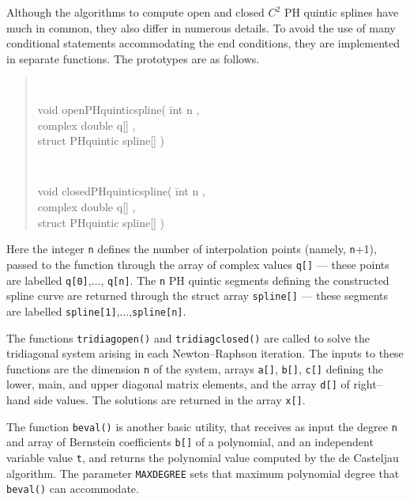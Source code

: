 \documentclass[12pt]{article}
\begin{document}
Although the algorithms to compute open and closed $C^2$ PH quintic splines 
have much in common, they also differ in numerous details. To avoid the use 
of many conditional statements accommodating the end conditions, they are 
implemented in separate functions. The prototypes are as follows. 

\begin{quote}
{\tt
\begin{tabbing}
void open\underline{\hphantom{x}}PHquintic\underline{\hphantom{x}}spline( 
\= int n , \\
\> complex double q[] , \\
\> struct PHquintic spline[] )
\end{tabbing}
}

{\tt
\begin{tabbing}
void closed\underline{\hphantom{x}}PHquintic\underline{\hphantom{x}}spline( 
\= int n , \\
\> complex double q[] , \\
\> struct PHquintic spline[] )
\end{tabbing}
}
\end{quote}

\noindent
Here the integer {\tt n} defines the number of interpolation points 
(namely, {\tt n}+1), passed to the function through the array of complex 
values {\tt q[]} --- these points are labelled {\tt q[0]},$\ldots$,
{\tt q[n]}. The {\tt n} PH quintic segments defining the constructed 
spline curve are returned through the struct array {\tt spline[]} --- 
these segments are labelled {\tt spline[1]},$\ldots$,{\tt spline[n]}.

\bigskip\noindent
The functions {\tt tridiag\underline{\hphantom{x}}open()} and
{\tt tridiag\underline{\hphantom{x}}closed()} are called to solve 
the tridiagonal system arising in each Newton--Raphson iteration. 
The inputs to these functions are the dimension {\tt n} of the system, 
arrays {\tt a[]}, {\tt b[]}, {\tt c[]} defining the lower, main, and 
upper diagonal matrix elements, and the array {\tt d[]} of right--hand 
side values. The solutions are returned in the array {\tt x[]}. 

\bigskip\noindent
The function {\tt beval()} is another basic utility, that receives as
input the degree {\tt n} and array of Bernstein coefficients {\tt b[]} of 
a polynomial, and an independent variable value {\tt t}, and returns the 
polynomial value computed by the de Casteljau algorithm. The parameter
{\tt MAXDEGREE} sets that maximum polynomial degree that {\tt beval()}
can accommodate.
\end{document}
